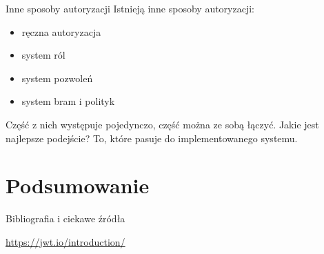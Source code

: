 \begin{frame}{Inne sposoby autoryzacji}
	Istnieją inne sposoby autoryzacji:
	\begin{itemize}
		\item ręczna autoryzacja
		\item system ról
		\item system pozwoleń
		\item system bram i polityk
	\end{itemize}
	
	Część z nich występuje pojedynczo, część można ze sobą łączyć. Jakie jest najlepsze podejście? To, które pasuje do implementowanego systemu.
\end{frame}

\section{Podsumowanie}

\begin{frame}{Bibliografia i ciekawe źródła}
  
	\begin{thebibliography}{9}
		
		\url{https://jwt.io/introduction/}
		
	\end{thebibliography}

\end{frame}

